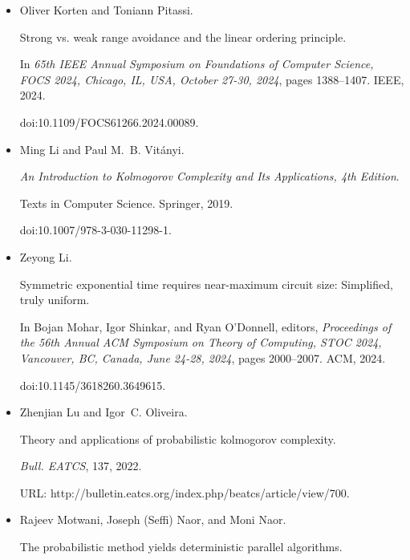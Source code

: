 \documentclass[10pt,a4paper]{article}
\begin{document}
\begin{itemize}
\item[] 
[21]

Oliver Korten and Toniann Pitassi.


Strong vs. weak range avoidance and the linear ordering principle.


In \emph{65th IEEE Annual Symposium on Foundations of Computer
Science, FOCS 2024, Chicago, IL, USA, October 27-30, 2024}, pages
1388–1407. IEEE, 2024.


doi:10.1109/FOCS61266.2024.00089.





\item[] 
[22]

Ming Li and Paul M. B. Vitányi.


\emph{An Introduction to Kolmogorov Complexity and Its Applications,
4th Edition}.


Texts in Computer Science. Springer, 2019.


doi:10.1007/978-3-030-11298-1.





\item[] 
[23]

Zeyong Li.


Symmetric exponential time requires near-maximum circuit size:
Simplified, truly uniform.


In Bojan Mohar, Igor Shinkar, and Ryan O’Donnell, editors, \emph{Proceedings of the 56th Annual ACM Symposium on Theory of Computing, STOC
2024, Vancouver, BC, Canada, June 24-28, 2024}, pages 2000–2007. ACM,
2024.


doi:10.1145/3618260.3649615.





\item[] 
[24]

Zhenjian Lu and Igor C. Oliveira.


Theory and applications of probabilistic kolmogorov complexity.


\emph{Bull. EATCS}, 137, 2022.


URL:
http://bulletin.eatcs.org/index.php/beatcs/article/view/700.





\item[] 
[25]

Rajeev Motwani, Joseph (Seffi) Naor, and Moni Naor.


The probabilistic method yields deterministic parallel algorithms.



\end{itemize}
\end{document}
